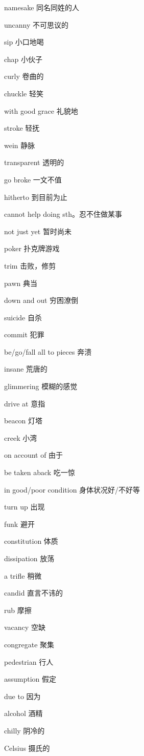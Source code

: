 \documentclass[lang=cn,10pt]{elegantbook}
\begin{document}
	namesake 同名同姓的人
	
	uncanny 不可思议的
	
	sip 小口地喝
	
	chap 小伙子
	
	curly 卷曲的
	
	chuckle 轻笑
	
	with good grace 礼貌地
	
	stroke 轻抚
	
	wein 静脉
	
	transparent 透明的
	
	go broke 一文不值
	
	hitherto 到目前为止
	
	cannot help doing sth。忍不住做某事
	
	not just yet 暂时尚未
	
	poker 扑克牌游戏
	
	trim 击败，修剪
	
	pawn 典当
	
	down and out 穷困潦倒
	
	suicide 自杀
	
	commit 犯罪
	
	be/go/fall all to pieces 奔溃
	
	insane 荒唐的
	
	glimmering 模糊的感觉
	
	drive at 意指
	
	beacon 灯塔
	
	creek 小湾
	
	on account of 由于
	
	be taken aback 吃一惊
	
	in good/poor condition 身体状况好/不好等
	
	turn up 出现
	
	funk  避开
	
	constitution 体质
	
	dissipation 放荡
	
	a trifle 稍微
	
	candid 直言不讳的
	
	rub 摩擦
	
	vacancy 空缺
	
	congregate 聚集
	
	pedestrian 行人
	
	assumption 假定
	
	due to 因为
	
	alcohol 酒精
	
	chilly 阴冷的
	
	Celsius 摄氏的
	
\end{document}
